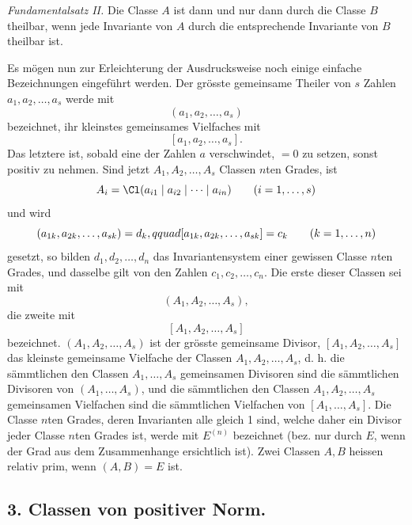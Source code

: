 \emph{Fundamentalsatz II.} Die Classe $A$ ist dann und nur dann durch die Classe $B$ theilbar, wenn jede Invariante von $A$ durch die entsprechende Invariante von $B$ theilbar ist.

Es mögen nun zur Erleichterung der Ausdrucksweise noch einige einfache Bezeichnungen eingeführt werden. Der grösste gemeinsame Theiler von $s$ Zahlen $a_1,a_2,\ldots,a_s$ werde mit
\[
 (a_1,a_2,\ldots,a_s)
\]
bezeichnet, ihr kleinstes gemeinsames Vielfaches mit
\[
 [a_1,a_2,\ldots,a_s].
\]
Das letztere ist, sobald eine der Zahlen $a$ verschwindet, $=0$ zu setzen, sonst positiv zu nehmen. Sind jetzt $A_1,A_2,\ldots,A_s$ Classen $n$ten Grades, ist
\[
 A_i=\Cl(a_{i1}\mid a_{i2}\mid\cdots\mid a_{in})\qquad (i=1,\ldots,s)
\]
und wird
\[
 (a_{1k},a_{2k},\ldots,a_{sk})=d_k,\\qquad [a_{1k},a_{2k},\ldots,a_{sk}]=c_k \qquad (k=1,\ldots,n)
\]
gesetzt, so bilden $d_1,d_2,\ldots,d_n$ das Invariantensystem einer gewissen Classe $n$ten Grades, und dasselbe gilt von den Zahlen $c_1,c_2,\ldots,c_n$. Die erste dieser Classen sei mit
\[
 (A_1,A_2,\ldots,A_s),
\]
die zweite mit
\[
 [A_1,A_2,\ldots,A_s]
\]
bezeichnet. $(A_1,A_2,\ldots,A_s)$ ist der grösste gemeinsame Divisor, $[A_1,A_2,\ldots,A_s]$ das kleinste gemeinsame Vielfache der Classen $A_1,A_2,\ldots,A_s$, d. h. die sämmtlichen den Classen $A_1,\ldots,A_s$ gemeinsamen Divisoren sind die sämmtlichen Divisoren von $(A_1,\ldots,A_s)$, und die sämmtlichen den Classen $A_1,A_2,\ldots,A_s$ gemeinsamen Vielfachen sind die sämmtlichen Vielfachen von $[A_1,\ldots,A_s]$. Die Classe $n$ten Grades, deren Invarianten alle gleich 1 sind, welche daher ein Divisor jeder Classe $n$ten Grades ist, werde mit $E^{(n)}$ bezeichnet (bez. nur durch $E$, wenn der Grad aus dem Zusammenhange ersichtlich ist). Zwei Classen $A,B$ heissen relativ prim, wenn $(A,B)=E$ ist.

\subsection*{3. Classen von positiver Norm.}

